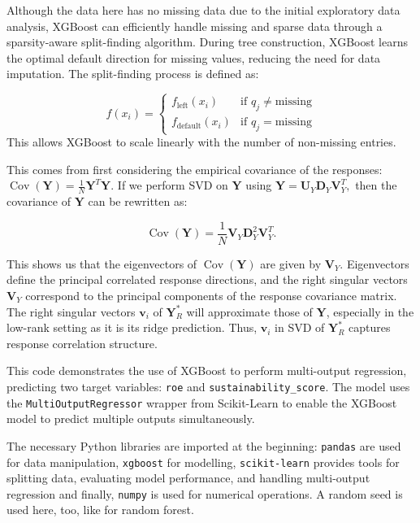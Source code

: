 Although the data here has no missing data due to the initial exploratory data analysis, XGBoost can efficiently handle missing and sparse data through a sparsity-aware split-finding algorithm.\cite{chen2016xgboost} During tree construction, XGBoost learns the optimal default direction for missing values, reducing the need for data imputation. The split-finding process is defined as:

\begin{equation*}
f(x_i) = \begin{cases}
f_{\text{left}}(x_i) & \text{if } q_j \neq \text{missing} \\
f_{\text{default}}(x_i) & \text{if } q_j = \text{missing}
\end{cases}
\end{equation*}
This allows XGBoost to scale linearly with the number of non-missing entries. \cite{chen2016xgboost}

 This comes from first considering the empirical covariance of the responses: $\operatorname{Cov}(\mathbf{Y}) = \frac{1}{N} \mathbf{Y}^T \mathbf{Y}.$ If we perform SVD on \( \mathbf{Y} \) using
$\mathbf{Y} = \mathbf{U}_Y \mathbf{D}_Y \mathbf{V}_Y^T,$
then the covariance of \( \mathbf{Y} \) can be rewritten as:

\[
\operatorname{Cov}(\mathbf{Y}) = \frac{1}{N} \mathbf{V}_Y \mathbf{D}_Y^2 \mathbf{V}_Y^T.
\]

\noindent This shows us that the eigenvectors of \( \operatorname{Cov}(\mathbf{Y}) \) are given by \( \mathbf{V}_Y \). Eigenvectors define the principal correlated response directions, and the right singular vectors \( \mathbf{V}_Y \) correspond to the principal components of the response covariance matrix. The right singular vectors \( \mathbf{v}_i \) of \( \mathbf{Y}^*_R \) will approximate those of \( \mathbf{Y} \),  especially in the low-rank setting as it is its ridge prediction. Thus, \( \mathbf{v}_i \) in SVD of \( \mathbf{Y}^*_R \) captures response correlation structure.

This code demonstrates the use of XGBoost to perform multi-output regression, predicting two target variables: \texttt{roe} and \texttt{sustainability\_score}. The model uses the \texttt{MultiOutputRegressor} wrapper from Scikit-Learn to enable the XGBoost model to predict multiple outputs simultaneously. 

The necessary Python libraries are imported at the beginning:
\texttt{pandas} are used for data manipulation, \texttt{xgboost} for modelling, \texttt{scikit-learn} provides tools for splitting data, evaluating model performance, and handling multi-output regression and finally, \texttt{numpy} is used for numerical operations.
A random seed is used here, too, like for random forest.

